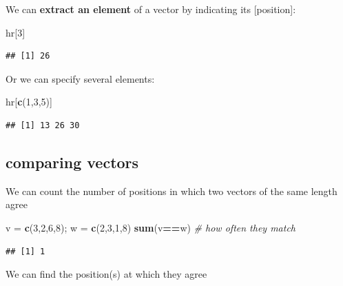 \documentclass[
]{book}
\newenvironment{Shaded}{\begin{snugshade}}{\end{snugshade}}
\newcommand{\CommentTok}[1]{\textcolor[rgb]{0.56,0.35,0.01}{\textit{#1}}}
\newcommand{\DecValTok}[1]{\textcolor[rgb]{0.00,0.00,0.81}{#1}}
\newcommand{\FunctionTok}[1]{\textcolor[rgb]{0.13,0.29,0.53}{\textbf{#1}}}
\newcommand{\NormalTok}[1]{#1}
\newcommand{\OtherTok}[1]{\textcolor[rgb]{0.56,0.35,0.01}{#1}}
\newcommand{\SpecialCharTok}[1]{\textcolor[rgb]{0.81,0.36,0.00}{\textbf{#1}}}
\theoremstyle{definition}
\theoremstyle{definition}
\theoremstyle{definition}
\theoremstyle{definition}
\theoremstyle{remark}
\begin{document}
We can \textbf{extract an element} of a vector by indicating its {[}position{]}:

\begin{Shaded}
\begin{Highlighting}[]
\NormalTok{hr[}\DecValTok{3}\NormalTok{]}
\end{Highlighting}
\end{Shaded}

\begin{verbatim}
## [1] 26
\end{verbatim}

Or we can specify several elements:

\begin{Shaded}
\begin{Highlighting}[]
\NormalTok{hr[}\FunctionTok{c}\NormalTok{(}\DecValTok{1}\NormalTok{,}\DecValTok{3}\NormalTok{,}\DecValTok{5}\NormalTok{)]}
\end{Highlighting}
\end{Shaded}

\begin{verbatim}
## [1] 13 26 30
\end{verbatim}

\subsection*{comparing vectors}\label{comparing-vectors}

We can count the number of positions in which two vectors of the same length agree

\begin{Shaded}
\begin{Highlighting}[]
\NormalTok{v }\OtherTok{=} \FunctionTok{c}\NormalTok{(}\DecValTok{3}\NormalTok{,}\DecValTok{2}\NormalTok{,}\DecValTok{6}\NormalTok{,}\DecValTok{8}\NormalTok{); w }\OtherTok{=} \FunctionTok{c}\NormalTok{(}\DecValTok{2}\NormalTok{,}\DecValTok{3}\NormalTok{,}\DecValTok{1}\NormalTok{,}\DecValTok{8}\NormalTok{)}
\FunctionTok{sum}\NormalTok{(v}\SpecialCharTok{==}\NormalTok{w) }\CommentTok{\# how often they match}
\end{Highlighting}
\end{Shaded}

\begin{verbatim}
## [1] 1
\end{verbatim}

We can find the position(s) at which they agree
\end{document}

